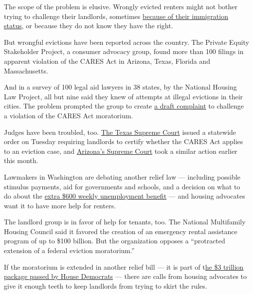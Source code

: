 The scope of the problem is elusive. Wrongly evicted renters might not
bother trying to challenge their landlords, sometimes
\href{https://www.nytimes3xbfgragh.onion/2020/07/04/us/coronavirus-evictions-renters-immigrants.html}{because
of their immigration status}, or because they do not know they have the
right.

But wrongful evictions have been reported across the country. The
Private Equity Stakeholder Project, a consumer advocacy group, found
more than 100 filings in apparent violation of the CARES Act in Arizona,
Texas, Florida and Massachusetts.

And in a survey of 100 legal aid lawyers in 38 states, by the National
Housing Law Project, all but nine said they knew of attempts at illegal
evictions in their cities. The problem prompted the group to create
\href{https://www.nhlp.org/campaign/protecting-renter-and-homeowner-rights-during-our-national-health-crisis-2/}{a
draft complaint} to challenge a violation of the CARES Act moratorium.

Judges have been troubled, too.
\href{http://www.txcourts.gov/media/1449329/209086.pdf}{The Texas
Supreme Court} issued a statewide order on Tuesday requiring landlords
to certify whether the CARES Act applies to an eviction case, and
\href{http://www.azcourts.gov/Portals/22/admorder/Orders20/2020-105Final.pdf?ver=2020-07-07-153304-167}{Arizona's
Supreme Court} took a similar action earlier this month.

Lawmakers in Washington are debating another relief law --- including
possible stimulus payments, aid for governments and schools, and a
decision on what to do about the
\href{https://www.nytimes3xbfgragh.onion/2020/07/21/business/economy/coronavirus-unemployment-benefits.html}{extra
\$600 weekly unemployment benefit} --- and housing advocates want it to
have more help for renters.

The landlord group is in favor of help for tenants, too. The National
Multifamily Housing Council said it favored the creation of an emergency
rental assistance program of up to \$100 billion. But the organization
opposes a ``protracted extension of a federal eviction moratorium.''

If the moratorium is extended in another relief bill --- it is part of
t\href{https://www.congress.gov/bill/116th-congress/house-bill/6800/text}{he
\$3 trillion package passed by House Democrats} --- there are calls from
housing advocates to give it enough teeth to keep landlords from trying
to skirt the rules.

